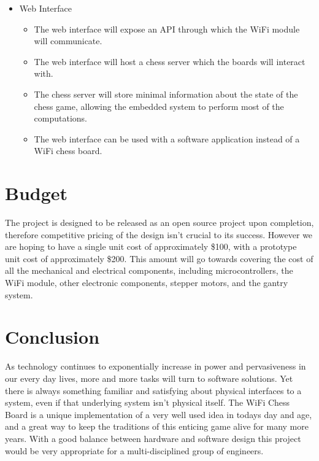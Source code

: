 \documentclass{article}
\begin{document}
\begin{itemize}
\begin{itemize}
\begin{itemize}
		\end{itemize}

	\end{itemize}

	\item Web Interface

	\begin{itemize}

		\item The web interface will expose an API through which the WiFi module will communicate.
		\item The web interface will host a chess server which the boards will interact with.
		\item The chess server will store minimal information about the state of the chess game, allowing the embedded system to perform most of the computations.
		\item The web interface can be used with a software application instead of a WiFi chess board.

	\end{itemize}

\end{itemize}

\section*{Budget}
\indent

The project is designed to be released as an open source project upon completion, therefore competitive pricing of the design isn't crucial to its success. However we are hoping to have a single unit cost of approximately \$100, with a prototype unit cost of approximately \$200. This amount will go towards covering the cost of all the mechanical and electrical components, including microcontrollers, the WiFi module, other electronic components, stepper motors, and the gantry system.

\section*{Conclusion}
\indent

As technology continues to exponentially increase in power and pervasiveness in our every day lives, more and more tasks will turn to software solutions. Yet there is always something familiar and satisfying about physical interfaces to a system, even if that underlying system isn't physical itself. The WiFi Chess Board is a unique implementation of a very well used idea in todays day and age, and a great way to keep the traditions of this enticing game alive for many more years. With a good balance between hardware and software design this project would be very appropriate for a multi-disciplined group of engineers.
\end{document}
